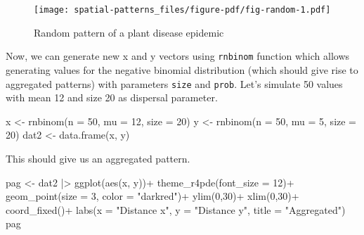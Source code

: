 \documentclass[
  letterpaper,
]{book}
\newenvironment{Shaded}{\begin{snugshade}}{\end{snugshade}}
\newcommand{\AttributeTok}[1]{\textcolor[rgb]{0.40,0.45,0.13}{#1}}
\newcommand{\DecValTok}[1]{\textcolor[rgb]{0.68,0.00,0.00}{#1}}
\newcommand{\FunctionTok}[1]{\textcolor[rgb]{0.28,0.35,0.67}{#1}}
\newcommand{\NormalTok}[1]{\textcolor[rgb]{0.00,0.23,0.31}{#1}}
\newcommand{\OtherTok}[1]{\textcolor[rgb]{0.00,0.23,0.31}{#1}}
\newcommand{\SpecialCharTok}[1]{\textcolor[rgb]{0.37,0.37,0.37}{#1}}
\newcommand{\StringTok}[1]{\textcolor[rgb]{0.13,0.47,0.30}{#1}}
\begin{document}
\begin{figure}[H]

{\centering \texttt{[image: spatial-patterns\_files/figure-pdf/fig-random-1.pdf]}

}

\caption{\label{fig-random}Random pattern of a plant disease epidemic}

\end{figure}

Now, we can generate new x and y vectors using \texttt{rnbinom} function
which allows generating values for the negative binomial distribution
(which should give rise to aggregated patterns) with parameters
\texttt{size} and \texttt{prob}. Let's simulate 50 values with mean 12
and size 20 as dispersal parameter.

\begin{Shaded}
\begin{Highlighting}[]
\NormalTok{x }\OtherTok{\textless{}{-}} \FunctionTok{rnbinom}\NormalTok{(}\AttributeTok{n =} \DecValTok{50}\NormalTok{, }\AttributeTok{mu =} \DecValTok{12}\NormalTok{, }\AttributeTok{size =} \DecValTok{20}\NormalTok{)}
\NormalTok{y }\OtherTok{\textless{}{-}} \FunctionTok{rnbinom}\NormalTok{(}\AttributeTok{n =} \DecValTok{50}\NormalTok{, }\AttributeTok{mu =} \DecValTok{5}\NormalTok{, }\AttributeTok{size =} \DecValTok{20}\NormalTok{)}
\NormalTok{dat2 }\OtherTok{\textless{}{-}} \FunctionTok{data.frame}\NormalTok{(x, y)}
\end{Highlighting}
\end{Shaded}

This should give us an aggregated pattern.

\begin{Shaded}
\begin{Highlighting}[]
\NormalTok{pag }\OtherTok{\textless{}{-}}\NormalTok{ dat2 }\SpecialCharTok{|\textgreater{}}
  \FunctionTok{ggplot}\NormalTok{(}\FunctionTok{aes}\NormalTok{(x, y))}\SpecialCharTok{+}
  \FunctionTok{theme\_r4pde}\NormalTok{(}\AttributeTok{font\_size =} \DecValTok{12}\NormalTok{)}\SpecialCharTok{+}
  \FunctionTok{geom\_point}\NormalTok{(}\AttributeTok{size =} \DecValTok{3}\NormalTok{, }\AttributeTok{color =} \StringTok{"darkred"}\NormalTok{)}\SpecialCharTok{+}
  \FunctionTok{ylim}\NormalTok{(}\DecValTok{0}\NormalTok{,}\DecValTok{30}\NormalTok{)}\SpecialCharTok{+}
  \FunctionTok{xlim}\NormalTok{(}\DecValTok{0}\NormalTok{,}\DecValTok{30}\NormalTok{)}\SpecialCharTok{+}
  \FunctionTok{coord\_fixed}\NormalTok{()}\SpecialCharTok{+}
  \FunctionTok{labs}\NormalTok{(}\AttributeTok{x =} \StringTok{"Distance x"}\NormalTok{, }\AttributeTok{y =} \StringTok{"Distance y"}\NormalTok{, }
       \AttributeTok{title =} \StringTok{"Aggregated"}\NormalTok{)}
\NormalTok{pag}
\end{Highlighting}
\end{Shaded}
\end{document}
